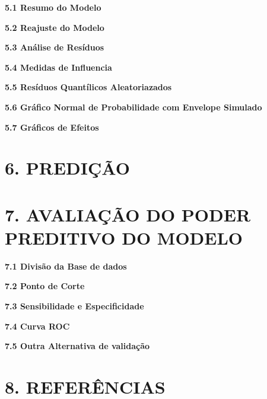 \documentclass[]{article}
\begin{document}
\textbf{5.1 Resumo do Modelo}

\textbf{5.2 Reajuste do Modelo}

\textbf{5.3 Análise de Resíduos}

\textbf{5.4 Medidas de Influencia}

\textbf{5.5 Resíduos Quantílicos Aleatoriazados}

\textbf{5.6 Gráfico Normal de Probabilidade com Envelope Simulado}

\textbf{5.7 Gráficos de Efeitos}

\section{6. PREDIÇÃO}\label{predicao}

\section{7. AVALIAÇÃO DO PODER PREDITIVO DO
MODELO}\label{avaliacao-do-poder-preditivo-do-modelo}

\textbf{7.1 Divisão da Base de dados}

\textbf{7.2 Ponto de Corte}

\textbf{7.3 Sensibilidade e Especificidade}

\textbf{7.4 Curva ROC}

\textbf{7.5 Outra Alternativa de validação}

\section{8. REFERÊNCIAS}\label{referencias}

\section{}\label{section}
\end{document}
